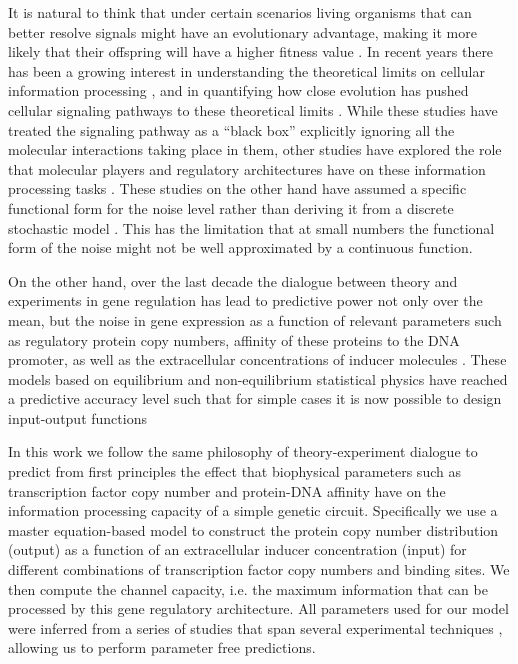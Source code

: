 It is natural to think that under certain scenarios living organisms that can
better resolve signals might have an evolutionary advantage, making it more
likely that their offspring will have a higher fitness value \cite{Taylor2007a}.
In recent years there has been a growing interest in understanding the
theoretical limits on cellular information processing \cite{Bialek2005,
Gregor2007}, and in quantifying how close evolution has pushed cellular
signaling pathways to these theoretical limits \cite{Tkacik2008, Dubuis2013,
Petkova2016}. While these studies have treated the signaling pathway as a
``black box'' explicitly ignoring all the molecular interactions taking place in
them, other studies have explored the role that molecular players and regulatory
architectures have on these information processing tasks \cite{Rieckh2014,
Ziv2007, Voliotis2014, Tostevin2009, Tkacik2011, Tkacik2008a, Tabbaa2014}. These
studies on the other hand have assumed a specific functional form for the noise
level rather than deriving it from a discrete stochastic model . This has the limitation that at small numbers the functional
form of the noise might not be well approximated by a continuous function.

On the other hand, over the last decade the dialogue between theory and
experiments in gene regulation has lead to predictive power not only over the
mean, but the noise in gene expression as a function of relevant parameters such
as regulatory protein copy numbers, affinity of these proteins to the DNA
promoter, as well as the extracellular concentrations of inducer
molecules \cite{Garcia2011c, Jones2014a, Brewster2014, Razo-Mejia2018} . These models based on equilibrium and
non-equilibrium statistical physics have reached a predictive accuracy level
such that for simple cases it is now possible to design input-output functions
\cite{Brewster2012} 

In this work we follow the same philosophy of theory-experiment dialogue to
predict from first principles the effect that biophysical parameters such as
transcription factor copy number and protein-DNA affinity have on the
information processing capacity of a simple genetic circuit. Specifically we use
a master equation-based model to construct the protein copy number distribution
(output) as a function of an extracellular inducer concentration (input) for
different combinations of transcription factor copy numbers and binding sites.
We then compute the channel capacity, i.e. the maximum information that can be
processed by this gene regulatory architecture. All parameters used for our
model were inferred from a series of studies that span several experimental
techniques \cite{Elf2007, Garcia2011c, Brewster2012, Jones2014a, Brewster2014,
Razo-Mejia2018} , allowing us to
perform parameter free predictions. 

